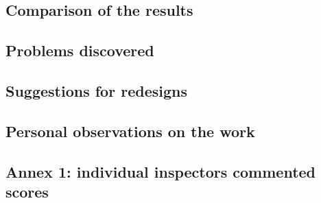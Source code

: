 \subsection{Comparison of the results}

\subsection{Problems discovered}

\subsection{Suggestions for redesigns}

\subsection{Personal observations on the work}


\pagebreak
\subsection{Annex 1: individual inspectors commented scores}
